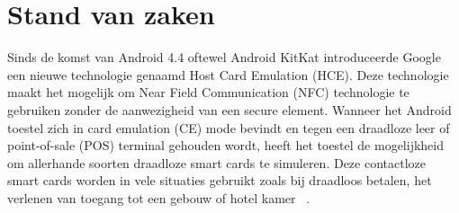 \chapter{Stand van zaken}
\label{ch:stand-van-zaken}



Sinds de komst van Android 4.4 oftewel Android KitKat introduceerde Google een nieuwe technologie genaamd Host Card Emulation (HCE). Deze technologie maakt het mogelijk om Near Field Communication (NFC) technologie te gebruiken zonder de aanwezigheid van een secure element. 
Wanneer het Android toestel zich in card emulation (CE) mode bevindt en tegen een draadloze leer of point-of-sale (POS) terminal gehouden wordt, heeft het toestel de mogelijkheid om allerhande soorten draadloze smart cards te simuleren. Deze contactloze smart cards worden in vele situaties gebruikt zoals bij draadloos betalen, het verlenen van toegang tot een gebouw of hotel kamer ~\autocite{SCA2014}.
